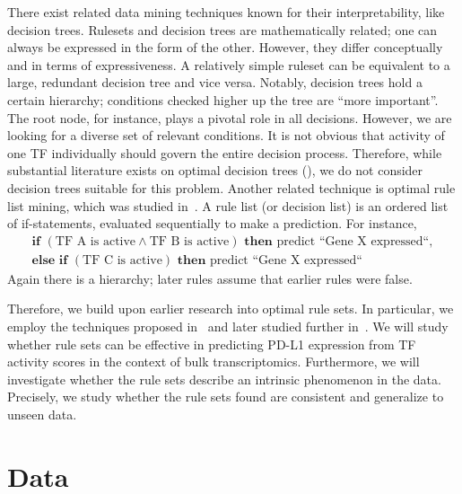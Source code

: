 There exist related data mining techniques known for their interpretability, like decision trees.
Rulesets and decision trees are mathematically related; one can always be expressed in the form of the other.
However, they differ conceptually and in terms of expressiveness.
A relatively simple ruleset can be equivalent to a large, redundant decision tree and vice versa.
Notably, decision trees hold a certain hierarchy; conditions checked higher up the tree are ``more important''.
The root node, for instance, plays a pivotal role in all decisions.
However, we are looking for a diverse set of relevant conditions.
It is not obvious that activity of one TF individually should govern the entire decision process.
Therefore, while substantial literature exists on optimal decision trees (\cite{van_der_linden_optimal_2026}),
we do not consider decision trees suitable for this problem.
Another related technique is optimal rule list mining, which was studied in~\cite{angelino_learning_2018}.
A rule list (or decision list) is an ordered list of if-statements, evaluated sequentially to make a prediction.
For instance,
\begin{gather*}
    \textbf{if } (\text{TF A is active} \wedge \text{TF B is active}) \textbf{ then } \text{predict ``Gene X expressed``},\\
    \textbf{else if } (\text{TF C is active}) \textbf{ then } \text{predict ``Gene X expressed``}
\end{gather*}
Again there is a hierarchy; later rules assume that earlier rules were false.

Therefore, we build upon earlier research into optimal rule sets.
In particular, we employ the techniques proposed in~\cite{dash_boolean_2020}
and later studied further in~\cite{lawless_interpretable_2023}.
We will study whether rule sets can be effective in predicting PD-L1 expression from TF activity scores
in the context of bulk transcriptomics.
Furthermore, we will investigate whether the rule sets describe an intrinsic phenomenon in the data.
Precisely, we study whether the rule sets found are consistent and generalize to unseen data.


\section{Data}\label{sec:data}


